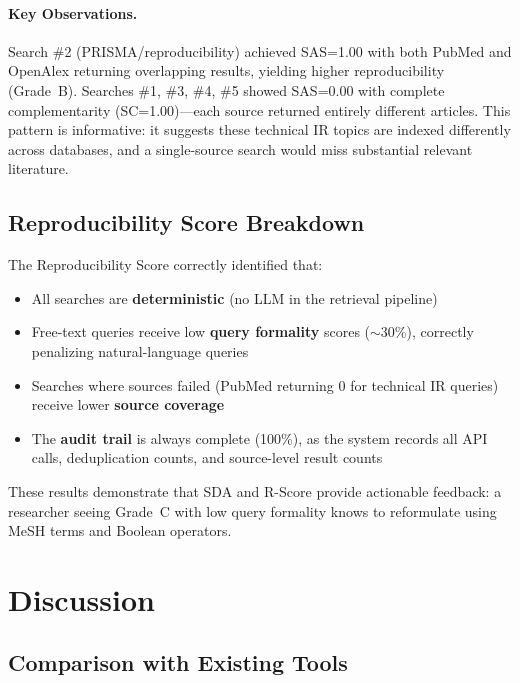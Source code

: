 \documentclass[11pt,a4paper]{article}
\begin{document}
\paragraph{Key Observations.}
Search \#2 (PRISMA/reproducibility) achieved SAS=1.00 with both PubMed and OpenAlex returning overlapping results, yielding higher reproducibility (Grade~B).
Searches \#1, \#3, \#4, \#5 showed SAS=0.00 with complete complementarity (SC=1.00)---each source returned entirely different articles.
This pattern is informative: it suggests these technical IR topics are indexed differently across databases, and a single-source search would miss substantial relevant literature.

\subsection{Reproducibility Score Breakdown}

The Reproducibility Score correctly identified that:
\begin{itemize}
    \item All searches are \textbf{deterministic} (no LLM in the retrieval pipeline)
    \item Free-text queries receive low \textbf{query formality} scores ($\sim$30\%), correctly penalizing natural-language queries
    \item Searches where sources failed (PubMed returning 0 for technical IR queries) receive lower \textbf{source coverage}
    \item The \textbf{audit trail} is always complete (100\%), as the system records all API calls, deduplication counts, and source-level result counts
\end{itemize}

These results demonstrate that SDA and R-Score provide actionable feedback: a researcher seeing Grade~C with low query formality knows to reformulate using MeSH terms and Boolean operators.

\section{Discussion}
\label{sec:discussion}

\subsection{Comparison with Existing Tools}
\end{document}
